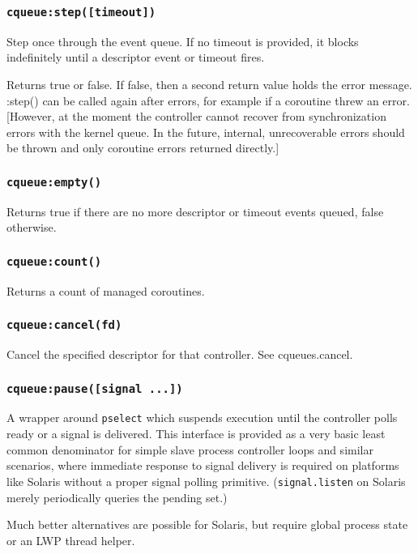 \documentclass[11pt, oneside]{memoir}
\newcommand*{\syscall}[1]{\texttt{#1}\xspace}
\newcommand*{\routine}[1]{\texttt{#1}\xspace}
\begin{document}
\subsubsection[\routine{cqueues:step}]{\routine{cqueue:step([timeout])}}
Step once through the event queue. If no timeout is provided, it blocks indefinitely until a descriptor event or timeout fires.

Returns true or false. If false, then a second return value holds the error message. :step() can be called again after errors, for example if a coroutine threw an error. [However, at the moment the controller cannot recover from synchronization errors with the kernel queue. In the future, internal, unrecoverable errors should be thrown and only coroutine errors returned directly.]

\subsubsection[\routine{cqueues:empty}]{\routine{cqueue:empty()}}
Returns true if there are no more descriptor or timeout events queued, false otherwise.

\subsubsection[\routine{cqueues:count}]{\routine{cqueue:count()}}
Returns a count of managed coroutines.

\subsubsection[\routine{cqueues:cancel}]{\routine{cqueue:cancel(fd)}}
Cancel the specified descriptor for that controller. See cqueues.cancel.

\subsubsection[\routine{cqueues:pause}]{\routine{cqueue:pause([signal ...])}}
A wrapper around \syscall{pselect} which suspends execution until the controller polls ready or a signal is delivered. This interface is provided as a very basic least common denominator for simple slave process controller loops and similar scenarios, where immediate response to signal delivery is required on platforms like Solaris without a proper signal polling primitive. (\routine{signal.listen} on Solaris merely periodically queries the pending set.)

Much better alternatives are possible for Solaris, but require global process state or an LWP thread helper.
\end{document}
